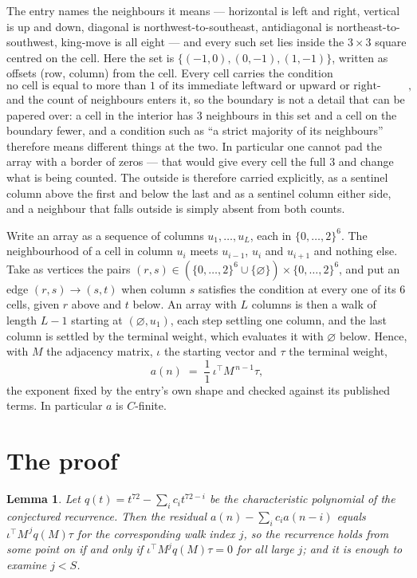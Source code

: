 \documentclass[11pt,a4paper]{article}
\theoremstyle{plain}
\newtheorem{lemma}[theorem]{Lemma}
\theoremstyle{definition}
\begin{document}
The entry names the neighbours it means --- horizontal is left and right, vertical is up and
down, diagonal is northwest-to-southeast, antidiagonal is northeast-to-southwest, king-move is
all eight --- and every such set lies inside the $3\times3$ square centred on the cell. Here
the set is $\{(-1,0), (0,-1), (1,-1)\}$, written as offsets (row, column) from the cell. Every cell carries
the condition
\[
\text{no cell is equal to more than 1 of its immediate leftward or upward or right-upward antidiagonal neighbours},
\]
and the count of neighbours enters it, so the boundary is not a detail that can be papered
over: a cell in the interior has $3$ neighbours in this set and a cell on the boundary
fewer, and a condition such as ``a strict majority of its neighbours'' therefore means
different things at the two. In particular one cannot pad the array with a border of zeros ---
that would give every cell the full $3$ and change what is being counted. The outside is
therefore carried
explicitly, as a sentinel column above the first and below the last and as a sentinel column
either side, and a neighbour that falls outside is simply absent from both counts.

Write an array as a sequence of columns $u_1,\dots,u_L$, each in
$\{0,\dots,2\}^{6}$. The neighbourhood of a cell in column $u_i$ meets $u_{i-1}$,
$u_i$ and $u_{i+1}$ and nothing else. Take as vertices the pairs
$(r,s)\in(\{0,\dots,2\}^{6}\cup\{\varnothing\})\times\{0,\dots,2\}^{6}$,
and put an edge $(r,s)\to(s,t)$ when column $s$ satisfies the condition at every one of its
$6$ cells, given $r$ above and $t$ below. An array with $L$ columns is then a walk of length
$L-1$ starting at $(\varnothing,u_1)$, each step settling one column, and the last column is
settled by the terminal weight, which evaluates it with $\varnothing$ below. Hence,
with $M$ the adjacency matrix, $\iota$ the starting vector and $\tau$ the terminal weight,
\[
a(n)\;=\;\frac{1}{1}\,\iota^{\!\top}M^{\,n-1}\tau ,
\]
the exponent fixed by the entry's own shape and checked against its published terms. In
particular $a$ is $C$-finite.

\section{The proof}

\begin{lemma}\label{lem:crit}
Let $q(t)=t^{72}-\sum_i c_it^{72-i}$ be the characteristic polynomial of the
conjectured recurrence. Then the residual $a(n)-\sum_ic_ia(n-i)$ equals
$\iota^{\!\top}M^{\,j}q(M)\tau$ for the corresponding walk index $j$, so the
recurrence holds from some point on if and only if $\iota^{\!\top}M^{j}q(M)\tau=0$ for all
large $j$; and it is enough to examine $j<S$.
\end{lemma}
\end{document}

